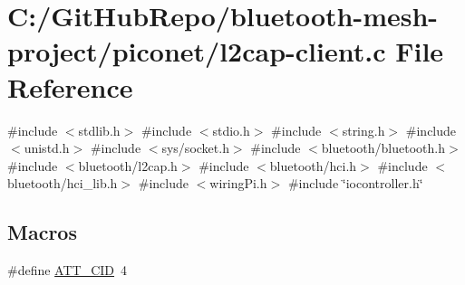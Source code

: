 \hypertarget{piconet_2l2cap-client_8c}{}\section{C\+:/\+Git\+Hub\+Repo/bluetooth-\/mesh-\/project/piconet/l2cap-\/client.c File Reference}
\label{piconet_2l2cap-client_8c}
{\ttfamily \#include $<$stdlib.\+h$>$}\newline
{\ttfamily \#include $<$stdio.\+h$>$}\newline
{\ttfamily \#include $<$string.\+h$>$}\newline
{\ttfamily \#include $<$unistd.\+h$>$}\newline
{\ttfamily \#include $<$sys/socket.\+h$>$}\newline
{\ttfamily \#include $<$bluetooth/bluetooth.\+h$>$}\newline
{\ttfamily \#include $<$bluetooth/l2cap.\+h$>$}\newline
{\ttfamily \#include $<$bluetooth/hci.\+h$>$}\newline
{\ttfamily \#include $<$bluetooth/hci\+\_\+lib.\+h$>$}\newline
{\ttfamily \#include $<$wiring\+Pi.\+h$>$}\newline
{\ttfamily \#include \char`\"{}iocontroller.\+h\char`\"{}}\newline
\subsection*{Macros}
\begin{DoxyCompactItemize}
\item 
\#define \mbox{\hyperlink{piconet_2l2cap-client_8c_acd26973fe5a2cba0e34e0d81717c6bda}{A\+T\+T\+\_\+\+C\+ID}}~4
\end{DoxyCompactItemize}
